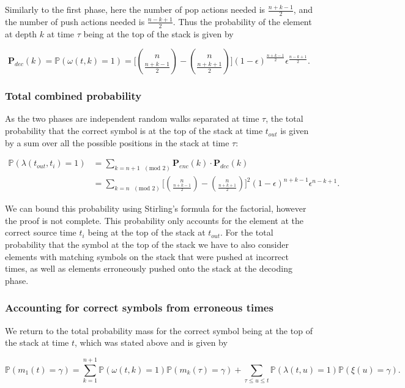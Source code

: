 \documentclass{article}
\newcommand{\eps}{\epsilon}
\begin{document}
Similarly to the first phase, here the number of pop actions needed is $\frac{n + k-1}{2}$, and the number of push actions needed is $\frac{n-k+1}{2}$. Thus the probability of the element at depth $k$ at time $\tau$ being at the top of the stack is given by 

$$
\mathbf{P}_{dec}(k)  = \mathbb{P}(\omega(t,k) = 1) = \bigg[\binom{n}{\frac{n+k-1}{2}} - \binom{n}{\frac{n+k+1}{2}}\bigg] (1- \eps)^{\frac{n + k-1}{2}} \eps^{\frac{n-k+1}{2}}.
$$


\subsubsection*{Total combined probability}

As the two phases are independent random walks separated at time $\tau$, the total probability that the correct symbol is at the top of the stack at time $t_{out}$ is given by a sum over all the possible positions in the stack at time $\tau$:

\begin{align*}
\mathbb{P}(\lambda(t_{out},t_{i}) = 1) &= \sum_{k = n+1 \text{ }(\text{mod }2)} \mathbf{P}_{enc}(k) \cdot \mathbf{P}_{dec}(k) \\
&= \sum_{k = n \text{ }(\text{mod }2)}  \bigg[\binom{n}{\frac{n+k-1}{2}} - \binom{n}{\frac{n+k+1}{2}}\bigg]^2 (1- \eps)^{n + k-1} \eps^{n-k+1}.
\end{align*}

We can bound this probability using Stirling's formula for the factorial, however the proof is not complete. This probability only accounts for the element at the correct source time $t_i$ being at the top of the stack at $t_{out}$. For the total probability that the symbol at the top of the stack we have to also consider elements with matching symbols on the stack that were pushed at incorrect times, as well as elements erroneously pushed onto the stack at the decoding phase.

\subsubsection*{Accounting for correct symbols from erroneous times}

We return to the total probability mass for the correct symbol being at the top of the stack at time $t$, which was stated above and is given by 

$$
\mathbb{P}(m_1(t) = \gamma) = \sum_{k=1}^{n+1}\mathbb{P}(\omega(t,k) = 1)\mathbb{P}(m_k(\tau)=\gamma) + \sum_{\tau \leq u \leq t}\mathbb{P}(\lambda(t,u) = 1)\mathbb{P}(\xi(u) = \gamma).
$$
\end{document}
